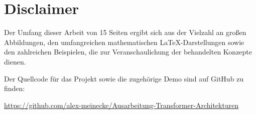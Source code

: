 \section*{Disclaimer}

Der Umfang dieser Arbeit von 15 Seiten ergibt sich aus der Vielzahl an großen Abbildungen, den umfangreichen mathematischen LaTeX-Darstellungen sowie den zahlreichen Beispielen, die zur Veranschaulichung der behandelten Konzepte dienen.


Der Quellcode für das Projekt sowie die zugehörige Demo sind auf GitHub zu finden:  

\url{https://github.com/alex-meinecke/Ausarbeitung-Transformer-Architekturen}